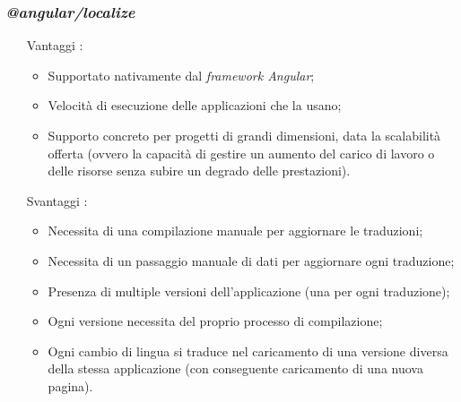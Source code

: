 \subsubsection*{\textit{@angular/localize}}
\begin{itemize}[align=left]
    \item [Vantaggi]:
        \begin{itemize}
            \item Supportato nativamente dal \textit{framework Angular};
            \item Velocità di esecuzione delle applicazioni che la usano;
            \item Supporto concreto per progetti di grandi dimensioni, data la scalabilità offerta (ovvero la capacità di gestire un aumento del carico di lavoro o delle risorse senza subire un degrado delle prestazioni).
        \end{itemize}
    \item [Svantaggi]:
        \begin{itemize}
            \item Necessita di una compilazione manuale per aggiornare le traduzioni;
            \item Necessita di un passaggio manuale di dati per aggiornare ogni traduzione;
            \item Presenza di multiple versioni dell’applicazione (una per ogni traduzione);
            \item Ogni versione necessita del proprio processo di compilazione;
            \item Ogni cambio di lingua si traduce nel caricamento di una versione diversa della stessa applicazione (con conseguente caricamento di una nuova pagina).
        \end{itemize}
\end{itemize}

